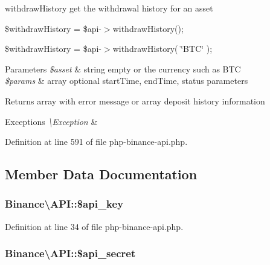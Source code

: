 withdraw\-History get the withdrawal history for an asset 

\$withdraw\-History = \$api-\/$>$withdraw\-History();

\$withdraw\-History = \$api-\/$>$withdraw\-History( \char`\"{}\-B\-T\-C\char`\"{} );


\begin{DoxyParams}{Parameters}
{\em \$asset} & string empty or the currency such as B\-T\-C \\
\hline
{\em \$params} & array optional start\-Time, end\-Time, status parameters \\
\hline
\end{DoxyParams}
\begin{DoxyReturn}{Returns}
array with error message or array deposit history information 
\end{DoxyReturn}

\begin{DoxyExceptions}{Exceptions}
{\em \textbackslash{}\-Exception} & \\
\hline
\end{DoxyExceptions}


Definition at line 591 of file php-\/binance-\/api.\-php.



\subsection{Member Data Documentation}
\hypertarget{classBinance_1_1API_a4b70fc1796d52440e44423da2cbafca5}{
\subsubsection[{\$api\-\_\-key}]{\setlength{\rightskip}{0pt plus 5cm}Binance\textbackslash{}\-A\-P\-I\-::\$api\-\_\-key\hspace{0.3cm}{\ttfamily [protected]}}}\label{classBinance_1_1API_a4b70fc1796d52440e44423da2cbafca5}


Definition at line 34 of file php-\/binance-\/api.\-php.

\hypertarget{classBinance_1_1API_a5612f3068ec5843031812893537e7677}{
\subsubsection[{\$api\-\_\-secret}]{\setlength{\rightskip}{0pt plus 5cm}Binance\textbackslash{}\-A\-P\-I\-::\$api\-\_\-secret\hspace{0.3cm}{\ttfamily [protected]}}}\label{classBinance_1_1API_a5612f3068ec5843031812893537e7677}


